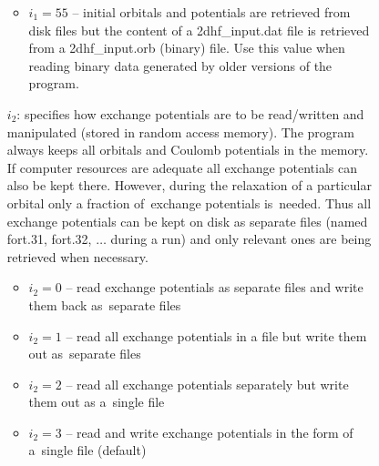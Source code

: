 \documentclass[12pt,a4paper]{article}
\begin{document}
\begin{description}
\begin{description}
\begin{itemize}
\begin{itemize}
\item $i_1=55$ -- initial orbitals and potentials are retrieved from disk files but the
  content of a 2dhf\_input.dat file is retrieved from a 2dhf\_input.orb (binary) file. Use
  this value when reading binary data generated by older versions of the program.

\end{itemize}

\item[$i_2$:] specifies how exchange potentials are to be read/written and manipulated
  (stored in random access memory). The program always keeps all orbitals and Coulomb
  potentials in the memory. If computer resources are adequate all exchange potentials can
  also be kept there. However, during the relaxation of a particular orbital only a
  fraction of~exchange potentials is~needed. Thus all exchange potentials can be kept on
  disk as separate files (named fort.31, fort.32, $\ldots$ during a run) and only relevant
  ones are being retrieved when necessary.
\begin{itemize} 
\item $i_2=0$ -- read exchange potentials as separate files and
                      write them back as~separate files
\item $i_2=1$ -- read all exchange potentials in a file but write
                       them out as~separate files
\item $i_2=2$ -- read all exchange potentials separately but write
                    them out as a~single file
\item $i_2=3$ -- read and write exchange potentials in the form of
                    a~single file (default)
\end{itemize} 


\end{itemize}
\end{description}
\end{description}
\end{document}
